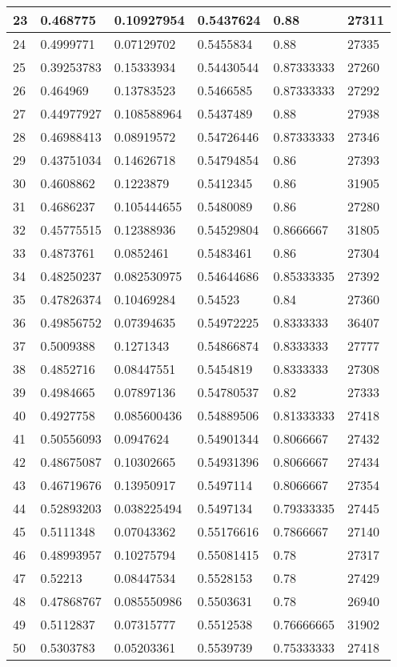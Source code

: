 \begin{longtable}{|l|l|l|l|l|l|}
23 & 0.468775 & 0.10927954 & 0.5437624 & 0.88 & 27311 \\ \hline 
24 & 0.4999771 & 0.07129702 & 0.5455834 & 0.88 & 27335 \\ \hline 
25 & 0.39253783 & 0.15333934 & 0.54430544 & 0.87333333 & 27260 \\ \hline 
26 & 0.464969 & 0.13783523 & 0.5466585 & 0.87333333 & 27292 \\ \hline 
27 & 0.44977927 & 0.108588964 & 0.5437489 & 0.88 & 27938 \\ \hline 
28 & 0.46988413 & 0.08919572 & 0.54726446 & 0.87333333 & 27346 \\ \hline 
29 & 0.43751034 & 0.14626718 & 0.54794854 & 0.86 & 27393 \\ \hline 
30 & 0.4608862 & 0.1223879 & 0.5412345 & 0.86 & 31905 \\ \hline 
31 & 0.4686237 & 0.105444655 & 0.5480089 & 0.86 & 27280 \\ \hline 
32 & 0.45775515 & 0.12388936 & 0.54529804 & 0.8666667 & 31805 \\ \hline 
33 & 0.4873761 & 0.0852461 & 0.5483461 & 0.86 & 27304 \\ \hline 
34 & 0.48250237 & 0.082530975 & 0.54644686 & 0.85333335 & 27392 \\ \hline 
35 & 0.47826374 & 0.10469284 & 0.54523 & 0.84 & 27360 \\ \hline 
36 & 0.49856752 & 0.07394635 & 0.54972225 & 0.8333333 & 36407 \\ \hline 
37 & 0.5009388 & 0.1271343 & 0.54866874 & 0.8333333 & 27777 \\ \hline 
38 & 0.4852716 & 0.08447551 & 0.5454819 & 0.8333333 & 27308 \\ \hline 
39 & 0.4984665 & 0.07897136 & 0.54780537 & 0.82 & 27333 \\ \hline 
40 & 0.4927758 & 0.085600436 & 0.54889506 & 0.81333333 & 27418 \\ \hline 
41 & 0.50556093 & 0.0947624 & 0.54901344 & 0.8066667 & 27432 \\ \hline 
42 & 0.48675087 & 0.10302665 & 0.54931396 & 0.8066667 & 27434 \\ \hline 
43 & 0.46719676 & 0.13950917 & 0.5497114 & 0.8066667 & 27354 \\ \hline 
44 & 0.52893203 & 0.038225494 & 0.5497134 & 0.79333335 & 27445 \\ \hline 
45 & 0.5111348 & 0.07043362 & 0.55176616 & 0.7866667 & 27140 \\ \hline 
46 & 0.48993957 & 0.10275794 & 0.55081415 & 0.78 & 27317 \\ \hline 
47 & 0.52213 & 0.08447534 & 0.5528153 & 0.78 & 27429 \\ \hline 
48 & 0.47868767 & 0.085550986 & 0.5503631 & 0.78 & 26940 \\ \hline 
49 & 0.5112837 & 0.07315777 & 0.5512538 & 0.76666665 & 31902 \\ \hline 
50 & 0.5303783 & 0.05203361 & 0.5539739 & 0.75333333 & 27418 \\ \hline 
\end{longtable}
